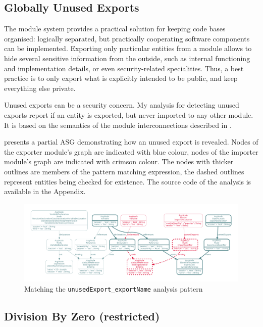 \subsection{Globally Unused Exports}

The \es module system provides a practical solution for keeping code bases organised: logically separated, but practically cooperating software components can be implemented. Exporting only particular entities from a module allows to hide several sensitive information from the outside, such as internal functioning and implementation details, or even security-related specialities. Thus, a best practice is to only export what is explicitly intended to be public, and keep everything else private.

Unused exports can be a security concern. My analysis for detecting unused exports report if an entity is exported, but never imported to any other module. It is based on the semantics of the module interconnections described in .

 presents a partial ASG demonstrating how an unused export is revealed. Nodes of the exporter module's graph are indicated with blue colour, nodes of the importer module's graph are indicated with crimson colour. The nodes with thicker outlines are members of the pattern matching expression, the dashed outlines represent entities being checked for existence. The source code of the analysis is available in the Appendix.

\vspace*{1mm}
\begin{figure}[!htb]
	\centering
	\includegraphics[width=\textwidth, trim=12mm 12mm 12mm 12mm,clip]{figures/analysis_exportName.pdf}
	\caption{Matching the \lstinline{unusedExport_exportName} analysis pattern}
	\label{fig:analysis-unusedexport}
\end{figure}


\subsection{Division By Zero (restricted)}

